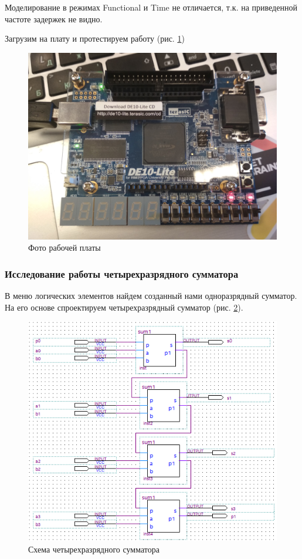 \documentclass[a4paper,14pt]{article}
\begin{document}
 Моделирование в режимах Functional и Time не отличается, т.к. на приведенной частоте задержек не видно.
 
 Загрузим на плату и протестируем работу (рис. \ref{fig:042foto})
 
 \begin{figure}[H]
 	\centering
 	\includegraphics[width=0.7\linewidth]{image/lab4/2020-03-1412-17-16.JPG}
 	\caption{Фото рабочей платы}
 	\label{fig:042foto}
 \end{figure}

\subsubsection{Исследование работы четырехразрядного сумматора}

В меню логических элементов найдем созданный нами одноразрядный сумматор. На его основе спроектируем четырехразрядный сумматор (рис. \ref{fig:044sumbdf}).

\begin{figure}[H]
	\centering
	\includegraphics[width=0.7\linewidth]{image/lab4/04_4sum_bdf}
	\caption{Схема четырехразрядного сумматора}
	\label{fig:044sumbdf}
\end{figure}
\end{document}
